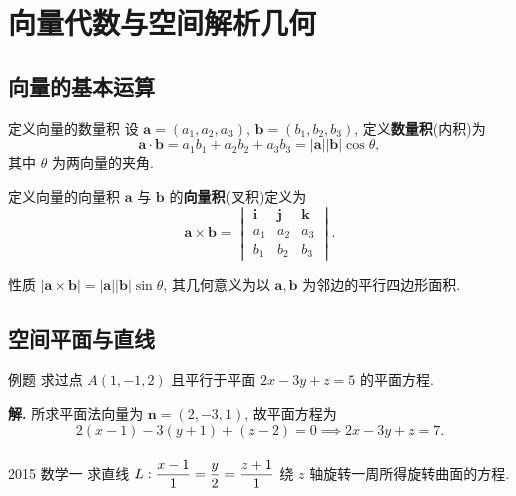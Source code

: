\documentclass[a4paper,12pt,oneside,fontset=none]{ctexbook}
\let\olddfrac\dfrac
\renewcommand{\dfrac}[2]{
    \olddfrac{#1\vrule width 0pt height 1.15em depth 0em}{#2\vrule width 0pt height 0em depth 0.6em}
}
\newenvironment{property}[1][]{\begin{thmBox}{性质}{#1}}{\end{thmBox}}
\newcounter{definition}[chapter]
\newenvironment{definition}[1][]{\begin{defBox}{定义}{#1}}{\end{defBox}}
\newcounter{example}[chapter]
\newenvironment{example}[1][]{\begin{exBox}{例题}{#1}}{\end{exBox}}
\newenvironment{realexam}[1][]
{%
\begin{realexamBox}{#1}}{\end{realexamBox}
}
\numberwithin{equation}{chapter}
\begin{document}
\chapter{向量代数与空间解析几何}

\section{向量的基本运算}

\begin{definition}[向量的数量积]
设 $\boldsymbol{a} = (a_1, a_2, a_3)$, $\boldsymbol{b} = (b_1, b_2, b_3)$, 定义\textbf{数量积}(内积)为
\[
    \boldsymbol{a} \cdot \boldsymbol{b} = a_1 b_1 + a_2 b_2 + a_3 b_3 = |\boldsymbol{a}||\boldsymbol{b}|\cos\theta,
\]
其中 $\theta$ 为两向量的夹角.
\end{definition}

\begin{definition}[向量的向量积]
$\boldsymbol{a}$ 与 $\boldsymbol{b}$ 的\textbf{向量积}(叉积)定义为
\[
    \boldsymbol{a} \times \boldsymbol{b} = 
    \begin{vmatrix}
        \boldsymbol{i} & \boldsymbol{j} & \boldsymbol{k} \\
        a_1 & a_2 & a_3 \\
        b_1 & b_2 & b_3
    \end{vmatrix}.
\]
\end{definition}

\begin{property}
$|\boldsymbol{a} \times \boldsymbol{b}| = |\boldsymbol{a}||\boldsymbol{b}|\sin\theta$, 其几何意义为以 $\boldsymbol{a}, \boldsymbol{b}$ 为邻边的平行四边形面积.
\end{property}

\section{空间平面与直线}

\begin{example}
求过点 $A(1, -1, 2)$ 且平行于平面 $2x - 3y + z = 5$ 的平面方程.
\end{example}

\textbf{解.} 所求平面法向量为 $\boldsymbol{n} = (2, -3, 1)$, 故平面方程为
\[
    2(x - 1) - 3(y + 1) + (z - 2) = 0 \implies 2x - 3y + z = 7.
\]

\begin{realexam}[2015 数学一]
求直线 $L: \dfrac{x - 1}{1} = \dfrac{y}{2} = \dfrac{z + 1}{1}$ 绕 $z$ 轴旋转一周所得旋转曲面的方程.
\end{realexam}
\end{document}
